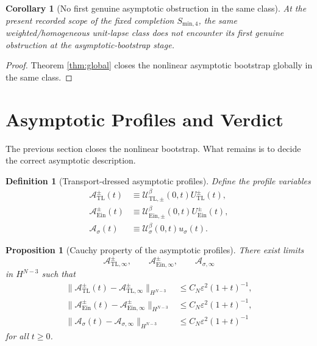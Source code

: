 \documentclass[11pt]{article}
\newtheorem{definition}{Definition}
\newtheorem{proposition}{Proposition}
\newtheorem{corollary}{Corollary}
\begin{document}
\begin{corollary}[No first genuine asymptotic obstruction in the same class]
\label{cor:noobs}
At the present recorded scope of the fixed completion \(S_{\mathrm{min},4}\), the same weighted/homogeneous unit-lapse class does \emph{not} encounter its first genuine obstruction at the asymptotic-bootstrap stage.
\end{corollary}

\begin{proof}
Theorem \ref{thm:global} closes the nonlinear asymptotic bootstrap globally in the same class.
\end{proof}

\section{Asymptotic Profiles and Verdict}

The previous section closes the nonlinear bootstrap. What remains is to decide the correct asymptotic description.

\begin{definition}[Transport-dressed asymptotic profiles]
\label{def:asylimits}
Define the profile variables
\begin{align}
\mathcal A_{\mathrm{TL}}^\pm(t)
&\equiv
\mathcal U_{\mathrm{TL},\pm}^\beta(0,t)U_{\mathrm{TL}}^\pm(t),
\label{eq:ATL}
\\
\mathcal A_{\mathrm{Ein}}^\pm(t)
&\equiv
\mathcal U_{\mathrm{Ein},\pm}^\beta(0,t)U_{\mathrm{Ein}}^\pm(t),
\label{eq:AEin}
\\
\mathcal A_\sigma(t)
&\equiv
\mathcal U_{\sigma}^\beta(0,t)u_\sigma(t).
\label{eq:Asig}
\end{align}
\end{definition}

\begin{proposition}[Cauchy property of the asymptotic profiles]
\label{prop:cauchy}
There exist limits
\[
\mathcal A_{\mathrm{TL},\infty}^\pm,
\qquad
\mathcal A_{\mathrm{Ein},\infty}^\pm,
\qquad
\mathcal A_{\sigma,\infty}
\]
in \(H^{N-3}\) such that
\begin{align}
\|\mathcal A_{\mathrm{TL}}^\pm(t)-\mathcal A_{\mathrm{TL},\infty}^\pm\|_{H^{N-3}}
&\le
C_N\varepsilon^2(1+t)^{-1},
\label{eq:ATLlimit}
\\
\|\mathcal A_{\mathrm{Ein}}^\pm(t)-\mathcal A_{\mathrm{Ein},\infty}^\pm\|_{H^{N-3}}
&\le
C_N\varepsilon^2(1+t)^{-1},
\label{eq:AEinlimit}
\\
\|\mathcal A_{\sigma}(t)-\mathcal A_{\sigma,\infty}\|_{H^{N-3}}
&\le
C_N\varepsilon^2(1+t)^{-1}
\label{eq:Asiglimit}
\end{align}
for all \(t\ge 0\).
\end{proposition}
\end{document}
